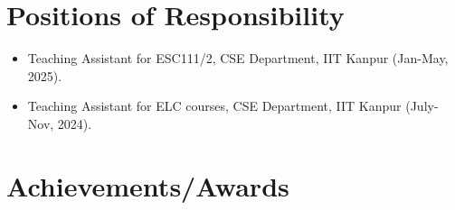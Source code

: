 \documentclass[11pt,a4paper,sans]{moderncv}
\begin{document}
\section{Positions of Responsibility}
\begin{itemize}
\item Teaching Assistant for ESC111/2, CSE Department, IIT Kanpur (Jan-May, 2025).
\item Teaching Assistant for ELC courses, CSE Department, IIT Kanpur (July-Nov, 2024).
\end{itemize}







\vspace{-1em}
\section{Achievements/Awards}
\end{document}
